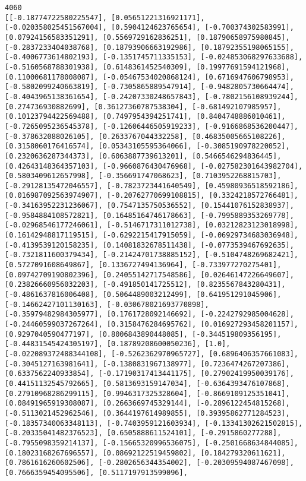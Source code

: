 \documentclass[11pt]{article}
\begin{document}
    \begin{Verbatim}[commandchars=\\\{\}]
4060
[[-0.18774722580225547], [0.05651221316921171], [-0.020358025451567004], [0.5904124623765654], [-0.700374302583991], [0.07924156583351291], [0.5569729162836251], [0.18790658975980845], [-0.2837233404038768], [0.18793906663192986], [0.18792355198065155], [-0.4006773614802193], [-0.1351745711335153], [-0.024853068297633688], [-0.5160568788301938], [0.6148361452540309], [0.19977691594121968], [0.11000681178008087], [-0.05467534020868124], [0.6716947606798953], [-0.5802099240663819], [-0.7305865889547914], [-0.9482805730664474], [-0.4043965138361654], [-0.24207330248657843], [-0.7802156108939244], [0.274736930882699], [0.36127360787538304], [-0.681492107985957], [0.10123794422569488], [0.7497954394251741], [0.8404748886010461], [-0.7265095236545378], [-0.12606446505919233], [-0.9166868536200447], [-0.378632088026105], [0.2633767044332258], [0.46835005665108226], [0.3158060176416574], [0.05343105595364066], [-0.3085190978220052], [0.2320636287344373], [0.6063887739613201], [0.5466546294836445], [0.42643148364357103], [-0.9660876430476968], [-0.027582301643982704], [0.5803409612657998], [-0.356691747068623], [0.7103952268815703], [-0.29128135472046557], [-0.7823723441640549], [0.45980936518592186], [0.016987092563974907], [-0.20762770699108815], [0.3324218572766481], [-0.34163952231236067], [0.7547135750536552], [0.15441076152838937], [-0.9584884108572821], [0.16485164746178663], [-0.7995889353269778], [-0.02968546177246061], [-0.5146717311012738], [0.03212823123018998], [0.16142948817119515], [-0.6292215417915059], [-0.06929734683036948], [-0.4139539120158235], [0.14081832678511438], [-0.0773539467692635], [-0.7321811600379434], [-0.21424701738885152], [-0.5104748269682421], [0.5727091608649867], [0.1336727494136964], [-0.733977270275401], [0.09742709190802396], [0.24055142717548586], [0.02646147226649607], [0.23826660956032203], [-0.491850141725512], [0.8235567843280431], [-0.4861637816006408], [0.5064489003212499], [0.641951291045906], [-0.14662427101130163], [-0.030678021693770898], [-0.35979482984305977], [0.1761728092146692], [-0.2242792985004628], [-0.24460599037267264], [0.3158476284695762], [0.016927293458201157], [0.9297040590477197], [0.8006843890448085], [-0.344519809356195], [-0.44831545424305197], [0.18789208600050236], [1.0], [-0.022089372488344108], [-0.5262362970965727], [0.6896406357661083], [-0.3045127163981641], [-0.1380831967138977], [0.7236474267207386], [0.6337562240933854], [-0.17190317413441175], [0.27902419950039176], [0.44151132545792665], [0.5813693159147034], [-0.6364393476107868], [0.27910968286299115], [0.9946317325328604], [-0.8669109125351041], [0.08491965919308087], [0.2663669745329144], [-0.2896122454815268], [-0.5113021452962546], [0.3644197614989855], [0.39395862771284523], [-0.18357340063348113], [-0.7403959121603934], [-0.13341302621502815], [-0.20335041482376523], [0.6505888611524101], [-0.2915860277288], [-0.7955098359214137], [-0.15665320996536075], [-0.2501668634844085], [0.18023168267696557], [0.08692122519459802], [0.184279320611621], [0.7861616260602506], [-0.2802656344354002], [-0.20309594087467098], [0.7666359454095506], [0.5117197913599096], 
\end{Verbatim}
\end{document}

